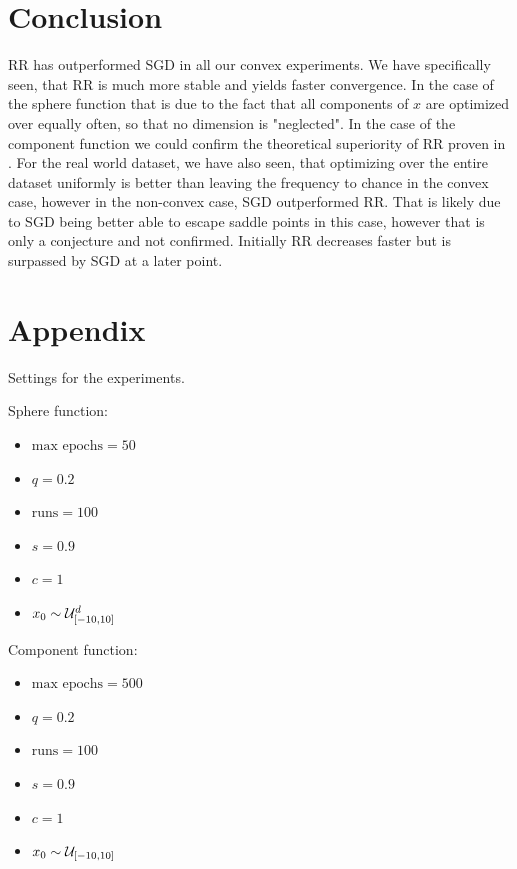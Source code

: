 \documentclass[10pt,conference,compsocconf]{IEEEtran}
\begin{document}
\section{Conclusion}

RR has outperformed SGD in all our convex experiments. We have specifically seen, that RR is much more stable and yields faster convergence. In the case of the sphere function that is due to the fact that all components of $x$ are optimized over equally often, so that no dimension is "neglected". In the case of the component function we could confirm the theoretical superiority of RR proven in \cite{COMPONENTFUNCTION}. For the real world dataset, we have also seen, that optimizing over the entire dataset uniformly is better than leaving the frequency to chance in the convex case, however in the non-convex case, SGD outperformed RR. That is likely due to SGD being better able to escape saddle points in this case, however that is only a conjecture and not confirmed. Initially RR decreases faster but is surpassed by SGD at a later point. 

\section{Appendix}

\noindent Settings for the experiments.

\medskip

\noindent Sphere function:

\begin{itemize}
	\item $\text{max epochs} = 50$
	\item $q = 0.2$
	\item $ \text{runs} = 100$
	\item $s = 0.9$
	\item $c = 1$
	\item $x_0 \sim {\cal U}_{[-10, 10]}^d$
\end{itemize}

\medskip

\noindent Component function:

\begin{itemize}
	\item $ \text{max epochs} = 500$
	\item $q = 0.2$
	\item $ \text{runs} = 100$
	\item $s = 0.9$
	\item $c = 1$
	\item $x_0 \sim {\cal U}_{[-10, 10]}$
\end{itemize}
\end{document}
